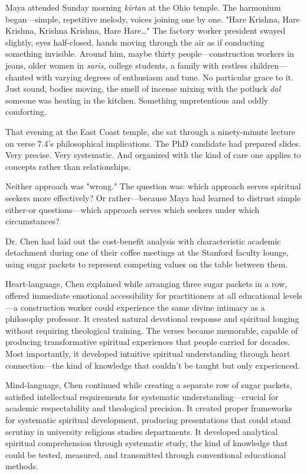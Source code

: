 \documentclass[12pt,twoside]{book}
\begin{document}
Maya attended Sunday morning \emph{kirtan} at the Ohio temple. The harmonium began—simple, repetitive melody, voices joining one by one. "Hare Krishna, Hare Krishna, Krishna Krishna, Hare Hare\ldots{}" The factory worker president swayed slightly, eyes half-closed, hands moving through the air as if conducting something invisible. Around him, maybe thirty people—construction workers in jeans, older women in \emph{saris}, college students, a family with restless children—chanted with varying degrees of enthusiasm and tune. No particular grace to it. Just sound, bodies moving, the smell of incense mixing with the potluck \emph{dal} someone was heating in the kitchen. Something unpretentious and oddly comforting.

That evening at the East Coast temple, she sat through a ninety-minute lecture on verse 7.4's philosophical implications. The PhD candidate had prepared slides. Very precise. Very systematic. And organized with the kind of care one applies to concepts rather than relationships.

Neither approach was "wrong." The question was: which approach serves spiritual seekers more effectively? Or rather—because Maya had learned to distrust simple either-or questions—which approach serves which seekers under which circumstances?

Dr. Chen had laid out the cost-benefit analysis with characteristic academic detachment during one of their coffee meetings at the Stanford faculty lounge, using sugar packets to represent competing values on the table between them.

Heart-language, Chen explained while arranging three sugar packets in a row, offered immediate emotional accessibility for practitioners at all educational levels—a construction worker could experience the same divine intimacy as a philosophy professor. It created natural devotional response and spiritual longing without requiring theological training. The verses became memorable, capable of producing transformative spiritual experiences that people carried for decades. Most importantly, it developed intuitive spiritual understanding through heart connection—the kind of knowledge that couldn't be taught but only experienced.

Mind-language, Chen continued while creating a separate row of sugar packets, satisfied intellectual requirements for systematic understanding—crucial for academic respectability and theological precision. It created proper frameworks for systematic spiritual development, producing presentations that could stand scrutiny in university religious studies departments. It developed analytical spiritual comprehension through systematic study, the kind of knowledge that could be tested, measured, and transmitted through conventional educational methods.
\end{document}
